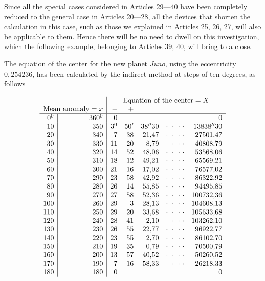 \begingroup
\renewcommand{\arraystretch}{1.45}

Since all the special cases considered in Articles 29---40 have been completely reduced to the general case in Articles 20---28, all the devices that shorten the calculation in this case, such as those we explained in Articles 25, 26, 27, will also be applicable to them. Hence there will be no need to dwell on this investigation, which the following example, belonging to Articles 39, 40, will bring to a close.

The equation of the center for the new planet \textit{Juno}, using the eccentricity \(0{,}254236\), has been calculated by the indirect method at steps of ten degrees, as follows

\[
\begin{array}{r|r|rrrcr}
\multicolumn{2}{c|}{}&
\multicolumn{5}{c}{\text{Equation of the center}=X}\\
\multicolumn{2}{r|}{\text{Mean anomaly}=x}&-&+&&&\\ \hline
0^{\mathord{0}}&360^{\mathord{0}}&0&&&&0\\
10&350&3^{\mathord{0}}&50'&38''30&\cdot\ \cdot\ \cdot\ \cdot&13838''30\\
20&340&7&38&21{,}47&\cdot\ \cdot\ \cdot\ \cdot&27501{,}47\\
30&330&11&20&8{,}79&\cdot\ \cdot\ \cdot\ \cdot&40808{,}79\\
40&320&14&52&48{,}06&\cdot\ \cdot\ \cdot\ \cdot&53568{,}06\\
50&310&18&12&49{,}21&\cdot\ \cdot\ \cdot\ \cdot&65569{,}21\\
60&300&21&16&17{,}02&\cdot\ \cdot\ \cdot\ \cdot&76577{,}02\\
70&290&23&58&42{,}92&\cdot\ \cdot\ \cdot\ \cdot&86322{,}92\\
80&280&26&14&55{,}85&\cdot\ \cdot\ \cdot\ \cdot&94495{,}85\\
90&270&27&58&52{,}36&\cdot\ \cdot\ \cdot\ \cdot&100732{,}36\\
100&260&29&3&28{,}13&\cdot\ \cdot\ \cdot\ \cdot&104608{,}13\\
110&250&29&20&33{,}68&\cdot\ \cdot\ \cdot\ \cdot&105633{,}68\\
120&240&28&41&2{,}10&\cdot\ \cdot\ \cdot\ \cdot&103262{,}10\\
130&230&26&55&22{,}77&\cdot\ \cdot\ \cdot\ \cdot&96922{,}77\\
140&220&23&55&2{,}70&\cdot\ \cdot\ \cdot\ \cdot&86102{,}70\\
150&210&19&35&0{,}79&\cdot\ \cdot\ \cdot\ \cdot&70500{,}79\\
160&200&13&57&40{,}52&\cdot\ \cdot\ \cdot\ \cdot&50260{,}52\\
170&190&7&16&58{,}33&\cdot\ \cdot\ \cdot\ \cdot&26218{,}33\\
180&180&0&&&&0
\end{array}
\]

